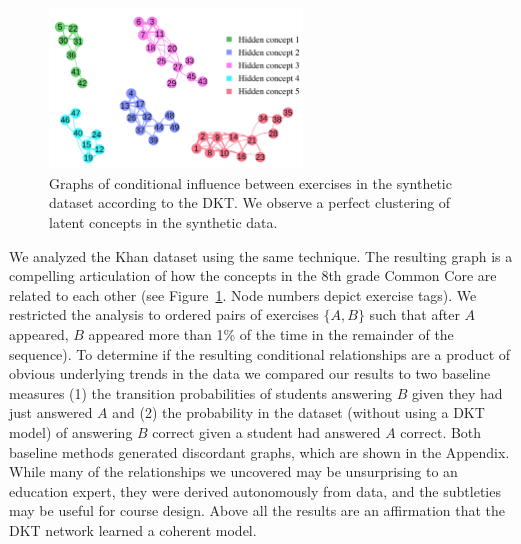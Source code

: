 \begin{figure}[!h]
\centering
\includegraphics[width=0.6\textwidth]{img/conceptClusters_synth}
\caption[Conditional influences synthetic data]{Graphs of conditional influence between exercises in the synthetic dataset according to the DKT. We observe a perfect clustering of latent concepts in the synthetic data. 
\label{fig:conceptClusters}
}
\end{figure}

We analyzed the Khan dataset using the same technique. The resulting graph is a compelling articulation of how the concepts in the 8th grade Common Core are related to each other (see Figure~\ref{fig:conceptClusters}. Node numbers depict exercise tags).
We restricted the analysis to ordered pairs of exercises $\{A,B\}$ such that after $A$ appeared, $B$ appeared more than 1\% of the time in the remainder of the sequence).
To determine if the resulting conditional relationships are a product of obvious underlying trends in the data we compared our results to two baseline measures (1) the transition probabilities of students answering $B$ given they had just answered $A$ and (2) the probability in the dataset (without using a DKT model) of answering $B$ correct given a student had answered $A$ correct.
Both baseline methods generated discordant graphs, which are shown in the Appendix. While many of the relationships we uncovered may be unsurprising to an education expert, they were derived autonomously from data, and the subtleties may be useful for course design. Above all the results are an affirmation that the DKT network learned a coherent model.


